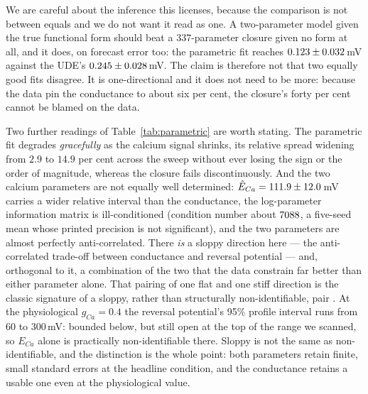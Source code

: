\documentclass{article}
\newcommand{\NparamUde}{337}   %
\newcommand{\gcaPhys}{0.4}     %
\begin{document}
We are careful about the inference this licenses, because the comparison is not
between equals and we do not want it read as one. A two-parameter model given the
true functional form should beat a $\NparamUde$-parameter closure given no form
at all, and it does, on forecast error too: the parametric fit reaches
$0.123 \pm 0.032$\,mV against the UDE's
$0.245 \pm 0.028$\,mV. The claim is therefore not that two
equally good fits disagree. It is one-directional and it does not need to be
more: because the data pin the conductance to about six per cent, the closure's
forty per cent cannot be blamed on the data.

Two further readings of Table~\ref{tab:parametric} are worth stating. The
parametric fit degrades \emph{gracefully} as the calcium signal shrinks, its
relative spread widening from $2.9$ to $14.9$ per cent across the sweep %
without ever losing the sign or the order of magnitude, whereas the closure fails
discontinuously. And the two calcium parameters are not equally well determined:
$\hat E_{Ca} = 111.9 \pm 12.0$\,mV carries a wider relative
interval than the conductance, the log-parameter information matrix is
ill-conditioned (condition number about $7088$, a five-seed mean
whose printed precision is not significant), and the two parameters are almost perfectly
anti-correlated. There \emph{is} a sloppy direction here --- the anti-correlated
trade-off between conductance and reversal potential --- and, orthogonal to it, a
combination of the two that the data constrain far better than either parameter
alone. That pairing of one flat and one stiff direction is the classic signature
of a sloppy, rather than structurally non-identifiable, pair \citep{raue2009, wieland2021}. At the
physiological $g_{Ca}=\gcaPhys$ the reversal potential's 95\% profile interval %
runs from $60$ to $300$\,mV: bounded below, but still open at the top of the %
range we scanned, so $E_{Ca}$ alone is practically non-identifiable there. Sloppy is not the same as
non-identifiable, and the distinction is the whole point: both parameters retain
finite, small standard errors at the headline condition, and the conductance
retains a usable one even at the physiological value.
\end{document}
